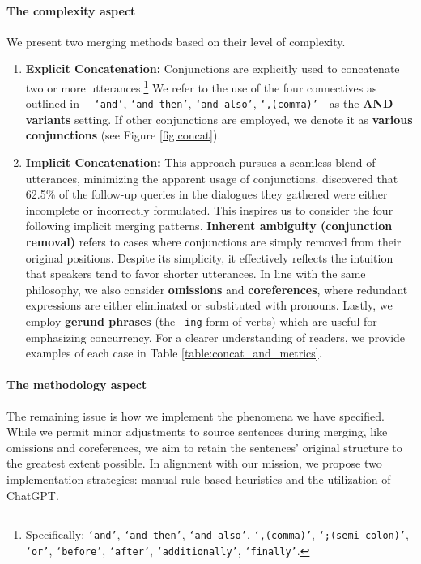 \paragraph{The complexity aspect}
We present two merging methods based on their level of complexity.

\begin{enumerate}
    \item \textbf{Explicit Concatenation:}    
    Conjunctions are explicitly used to concatenate two or more utterances.\footnote{Specifically: \texttt{`and'}, \texttt{`and then'}, \texttt{`and also'}, \texttt{`,(comma)'}, \texttt{`;(semi-colon)'}, \texttt{`or'}, \texttt{`before'}, \texttt{`after'}, \texttt{`additionally'}, \texttt{`finally'}.\label{fn:conjunctions}}
    We refer to the use of the four connectives as outlined in ---\texttt{`and'}, \texttt{`and then'}, \texttt{`and also'}, \texttt{`,(comma)'}---as the \textbf{AND variants} setting.    
    If other conjunctions are employed, we denote it as \textbf{various conjunctions} (see Figure \ref{fig:concat}).
    \item \textbf{Implicit Concatenation:} This approach pursues a seamless blend of utterances, minimizing the apparent usage of conjunctions.
    \citet{meng-etal-2022-dialogusr_} discovered that 62.5\% of the follow-up queries in the dialogues they gathered were either incomplete or incorrectly formulated.
    This inspires us to consider the four following implicit merging patterns.
    \textbf{Inherent ambiguity (conjunction removal)} refers to cases where conjunctions are simply removed from their original positions.
    Despite its simplicity, it effectively reflects the intuition that speakers tend to favor shorter utterances.
    In line with the same philosophy, we also consider \textbf{omissions} and \textbf{coreferences}, where redundant expressions are either eliminated or substituted with pronouns.
    Lastly, we employ \textbf{gerund phrases} (the \texttt{-ing} form of verbs) which are useful for emphasizing concurrency.
    For a clearer understanding of readers, we provide examples of each case in Table \ref{table:concat_and_metrics}.
\end{enumerate}

\paragraph{The methodology aspect}
The remaining issue is how we implement the phenomena we have specified.
While we permit minor adjustments to source sentences during merging, like omissions and coreferences, we aim to retain the sentences' original structure to the greatest extent possible.
In alignment with our mission, we propose two implementation strategies: manual rule-based heuristics and the utilization of ChatGPT.

